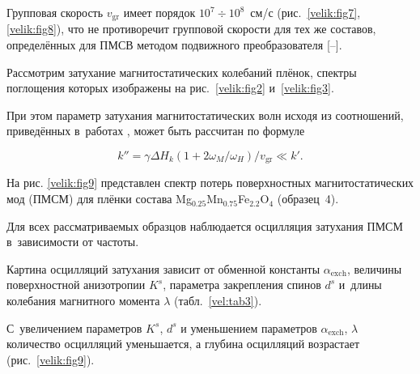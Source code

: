 Групповая скорость $v _\text{gr}$ имеет порядок $10^7 \div10^8$~см/с (рис.~\ref{velik:fig7}, \ref{velik:fig8}), что не противоречит групповой скорости для тех же составов, определённых для ПМСВ методом подвижного преобразователя  [--].





Рассмотрим затухание магнитостатических колебаний плёнок, спектры поглощения которых изображены на рис.~\ref{velik:fig2} и~\ref{velik:fig3}.

При этом параметр затухания магнитостатических волн исходя из соотношений, приведённых в~работах \cite{velik:M11, velik:M14}, может быть рассчитан по формуле

\begin{equation}

k'' = {\gamma \Delta H_k(1+2 \omega_M/\omega_H)}/{ v _\text{gr}} \ll k'.

\end{equation}







На рис. \ref{velik:fig9}  представлен спектр потерь поверхностных магнитостатических мод (ПМСМ)  для плёнки состава  Mg$_{0.25}$Mn$_{0.75}$Fe$_{2.2}$O$_4$ (образец~4).  

Для всех рассматриваемых образцов наблюдается осцилляция затухания ПМСМ в~зависимости от частоты.



Картина осцилляций затухания зависит от обменной константы $\alpha_\text{exch}$, величины поверхностной анизотропии $K^s$, параметра закрепления спинов $d^s$ и~длины колебания магнитного момента $\lambda$ (табл.~\ref{vel:tab3}).

С~увеличением параметров $K^s$, $d^s$ и уменьшением параметров $\alpha_\text{exch}$, $\lambda$ количество осцилляций уменьшается, а глубина осцилляций возрастает (рис.~\ref{velik:fig9}).







